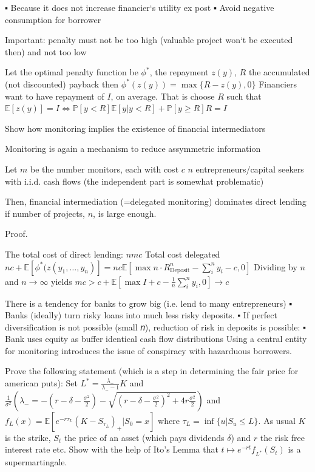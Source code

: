 ▪ Because it does not increase financier‘s utility ex post
▪ Avoid negative consumption for borrower

Important: penalty must not be too high (valuable project won‘t
be executed then) and not too low

Let the optimal penalty function be \( \phi^\ast \), the repayment \( z(y) \),
\( R \) the accumulated (not discounted) payback
then
\( \phi^\ast(z(y)) = \max\{R - z(y), 0\} \)
Financiers want to have repayment of \( I \), on average. That is
choose \( R \) such that
\( \mathbb{E}[z(y)] = I \iff \mathbb{P}[y < R]\mathbb{E}[y|y < R] + \mathbb{P}[y \geq R]R = I \)


Show how monitoring implies the existence of financial intermediators

Monitoring is again a mechanism to reduce assymmetric information

Let \( m \) be the number monitors, each with cost \( c \)
\( n \) entrepreneurs/capital seekers with i.i.d. cash flows (the independent part is somewhat problematic)

Then, financial intermediation (=delegated monitoring)
dominates direct lending if number of projects, \( n \), is large
enough.

Proof.

The total cost of direct lending:
\( n m c  \)
Total cost delegated 
\( nc + \mathbb{E}[\phi^\ast(z(y_1, \dots, y_n)] = nc \mathbb{E}[\max{n\cdot R^n_{\text{Deposit}} - \sum_i^n y_i - c, 0}] \)
Dividing by \( n \) and \( n \to \infty \) yields
\( mc > c + \mathbb{E}[\max{I + c - \frac{1}{n} \sum_i^n y_i, 0}] \to c \)


There is a tendency for banks to grow big (i.e. lend to many
entrepreneurs)
▪ Banks (ideally) turn risky loans into much less risky deposits.
▪ If perfect diversification is not possible (small 𝑛), reduction of
risk in deposits is possible:
▪ Bank uses equity as buffer identical cash flow distributions
Using a central entity for monitoring introduces the issue of conspiracy
with hazarduous borrowers.


Prove the following statement (which is a step in determining the fair price for american puts): 
Set $L^\ast = \frac{\lambda_{-}}{\lambda_{-} -1}K$ and $\frac{1}{\sigma^2}(\lambda_{-} = -(r - \delta - \frac{\sigma^2}{2}) - \sqrt{(r - \delta - \frac{\sigma^2}{2})^2 + 4r\frac{\sigma^2}{2}})$ and $ f_L(x) = \mathbb{E}[e^{-r\tau_L}(K - S_{\tau_L})_{+}|S_0 = x]$ where $\tau_L = \inf \{u | S_u \leq L\}$. As usual $K$ is the strike, $S_t$ the price of an asset (which pays dividends $\delta$) and $r$ the risk free interest rate etc. Show with the help of Ito's Lemma that $t \mapsto e^{-rt}f_{L^\ast}(S_t)$ is a supermartingale.
